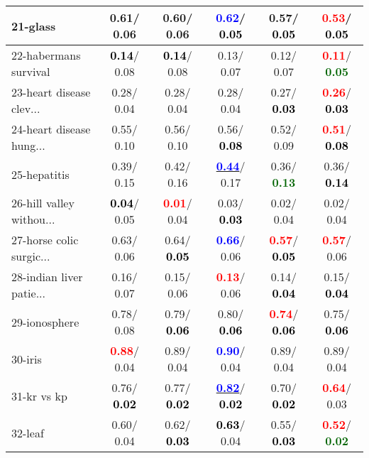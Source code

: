 \begin{table}[h]
\begin{center}
\begin{tabular}{lc|c|c|c|c}
21-glass &   0.61/  0.06 &   0.60/  0.06 & \textcolor{blue}{\textbf{  0.62}}/\textcolor{black}{\textbf{  0.05}} &   0.57/\textcolor{black}{\textbf{  0.05}} & \textcolor{red}{\textbf{  0.53}}/\textcolor{black}{\textbf{  0.05}} \\ \hline
22-habermans survival & \textcolor{black}{\textbf{  0.14}}/  0.08 & \textcolor{black}{\textbf{  0.14}}/  0.08 &   0.13/  0.07 &   0.12/  0.07 & \textcolor{red}{\textbf{  0.11}}/\textcolor{darkgreen}{\textbf{  0.05}} \\
23-heart disease clev... &   0.28/  0.04 &   0.28/  0.04 &   0.28/  0.04 &   0.27/\textcolor{black}{\textbf{  0.03}} & \textcolor{red}{\textbf{  0.26}}/\textcolor{black}{\textbf{  0.03}} \\
24-heart disease hung... &   0.55/  0.10 &   0.56/  0.10 &   0.56/\textcolor{black}{\textbf{  0.08}} &   0.52/  0.09 & \textcolor{red}{\textbf{  0.51}}/\textcolor{black}{\textbf{  0.08}} \\
25-hepatitis &   0.39/  0.15 &   0.42/  0.16 & \underline{\textcolor{blue}{\textbf{  0.44}}}/  0.17 &   0.36/\textcolor{darkgreen}{\textbf{  0.13}} &   0.36/\textcolor{black}{\textbf{  0.14}} \\
26-hill valley withou... & \textcolor{black}{\textbf{  0.04}}/  0.05 & \textcolor{red}{\textbf{  0.01}}/  0.04 &   0.03/\textcolor{black}{\textbf{  0.03}} &   0.02/  0.04 &   0.02/  0.04 \\
27-horse colic surgic... &   0.63/  0.06 &   0.64/\textcolor{black}{\textbf{  0.05}} & \textcolor{blue}{\textbf{  0.66}}/  0.06 & \textcolor{red}{\textbf{  0.57}}/\textcolor{black}{\textbf{  0.05}} & \textcolor{red}{\textbf{  0.57}}/  0.06 \\
28-indian liver patie... &   0.16/  0.07 &   0.15/  0.06 & \textcolor{red}{\textbf{  0.13}}/  0.06 &   0.14/\textcolor{black}{\textbf{  0.04}} &   0.15/\textcolor{black}{\textbf{  0.04}} \\ \hline
29-ionosphere &   0.78/  0.08 &   0.79/\textcolor{black}{\textbf{  0.06}} &   0.80/\textcolor{black}{\textbf{  0.06}} & \textcolor{red}{\textbf{  0.74}}/\textcolor{black}{\textbf{  0.06}} &   0.75/\textcolor{black}{\textbf{  0.06}} \\
30-iris & \textcolor{red}{\textbf{  0.88}}/  0.04 &   0.89/  0.04 & \textcolor{blue}{\textbf{  0.90}}/  0.04 &   0.89/  0.04 &   0.89/  0.04 \\
31-kr vs kp &   0.76/\textcolor{black}{\textbf{  0.02}} &   0.77/\textcolor{black}{\textbf{  0.02}} & \underline{\textcolor{blue}{\textbf{  0.82}}}/\textcolor{black}{\textbf{  0.02}} &   0.70/\textcolor{black}{\textbf{  0.02}} & \textcolor{red}{\textbf{  0.64}}/  0.03 \\
32-leaf &   0.60/  0.04 &   0.62/\textcolor{black}{\textbf{  0.03}} & \textcolor{black}{\textbf{  0.63}}/  0.04 &   0.55/\textcolor{black}{\textbf{  0.03}} & \textcolor{red}{\textbf{  0.52}}/\textcolor{darkgreen}{\textbf{  0.02}} \\\end{tabular}\label{stratsALCKappa0bRFwRedux}
\end{center}
\end{table}
